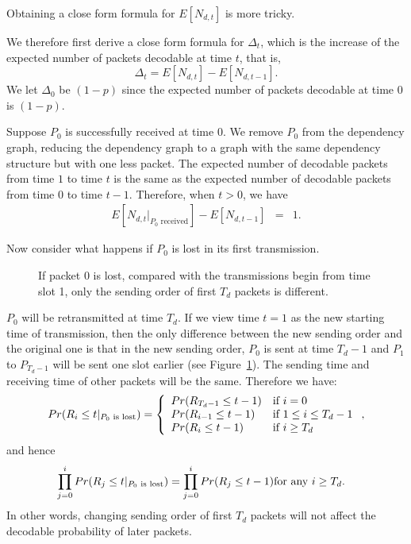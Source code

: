     Obtaining a close form formula for $E[N_{d,t}]$ is more tricky.
    
    We therefore first derive a close form formula for $\Delta_t$, which is 
    the increase of the expected number of packets decodable at time $t$,
    that is, 
    \begin{displaymath}
        \Delta_t = E[N_{d,t}] - E[N_{d,t-1}]. 
    \end{displaymath}
    We let $\Delta_0$ be $(1-p)$ since
    the expected number of packets decodable at time 0 is $(1-p)$.

    Suppose $P_0$ is successfully received at time $0$.  We remove $P_0$
    from the dependency graph, reducing the dependency graph to a 
    graph with the same dependency structure
    but with one less packet.  The expected number of decodable
    packets from time $1$ to time $t$ is the same as the expected
    number of decodable packets from time $0$ to time $t-1$.  Therefore,
    when $t>0$, we have
    \begin{eqnarray}
    \label{e:model:p0received}
    E[N_{d,t}|_{\textrm{$P_0$ received}}] - E[N_{d,t-1}] &=& 1.%
    \end{eqnarray}

    Now consider what happens if $P_0$ is lost in its first transmission. 
\begin{figure}[htbp]
\centering
{}
\caption{If packet $0$ is lost, compared with the transmissions begin from time slot 1, only the sending order of first $T_d$ packets is different.}\label{f:model:comp}
\end{figure}
    $P_0$ will be retransmitted at time $T_d$. If we view time $t=1$ as
    the new starting time of transmission, then the only difference between the new
    sending order and the original one is that in the new sending order, $P_0$ is
    sent at time $T_d-1$ and $P_1$ to $P_{T_d-1}$ will be 
    sent one slot earlier (see Figure~\ref{f:model:comp}). The sending time 
    and receiving time of other packets will be the same. 
    Therefore we have:
    \begin{eqnarray}
    \label{e:model:p0notreceived}
        Pr(R_i \le t|_{\textrm{$P_0$ is lost}})= \left\{\begin{array}{ll}
        Pr(R_{T_d-1} \le t-1)             & \textrm{if $i = 0$}\\
        Pr(R_{i-1}   \le t-1)             & \textrm{if $1 \le i \le T_d - 1$}\\
        Pr(R_i       \le t-1)             & \textrm{if $i \ge T_d$} \\
        \end{array}\right.,
    \end{eqnarray} 
    and hence
    \begin{eqnarray}
    \label{e:model:equal}
       \prod_{j=0}^{i}Pr(R_j \le t|_{\textrm{$P_0$ is lost}}) = \prod_{j=0}^{i}Pr(R_j \le t-1) & \textrm{for any $i \ge T_d$}.
    \end{eqnarray}
    In other words, changing sending order of first $T_d$ packets will not
    affect the decodable probability of later packets.

